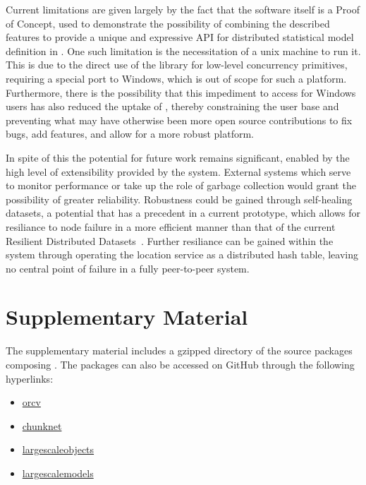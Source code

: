 \documentclass[letterpaper, inpress]{jds} %
\begin{document}
Current limitations are given largely by the fact that the software itself is a Proof of Concept, used to demonstrate the possibility of combining the described features to provide a unique and expressive API for distributed statistical model definition in .
One such limitation is the necessitation of a unix machine to run it.
This is due to the direct use of the  library for low-level concurrency primitives, requiring a special port to Windows, which is out of scope for such a platform.
Furthermore, there is the possibility that this impediment to access for Windows users has also reduced the uptake of , thereby constraining the user base and preventing what may have otherwise been more open source contributions to fix bugs, add features, and allow for a more robust platform.

In spite of this the potential for future work remains significant, enabled by the high level of extensibility provided by the system.
External systems which serve to monitor performance or take up the role of garbage collection would grant the possibility of greater reliability.
Robustness could be gained through self-healing datasets, a potential that has a precedent in a current prototype, which allows for resiliance to node failure in a more efficient manner than that of the current Resilient Distributed Datasets~\citep{zaharia2012resilient}.
Further resiliance can be gained within the system through operating the location service as a distributed hash table, leaving no central point of failure in a fully peer-to-peer system.

\section*{Supplementary Material}
The supplementary material includes a gzipped directory of the source packages composing .
The packages can also be accessed on GitHub through the following hyperlinks:
\begin{itemize}
\item \href{https://github.com/jcai849/orcv}{orcv}
\item \href{https://github.com/jcai849/chunknet}{chunknet}
\item \href{https://github.com/jcai849/largescaleobjects}{largescaleobjects}
\item \href{https://github.com/jcai849/largescalemodels}{largescalemodels}
\end{itemize}



\end{document}
